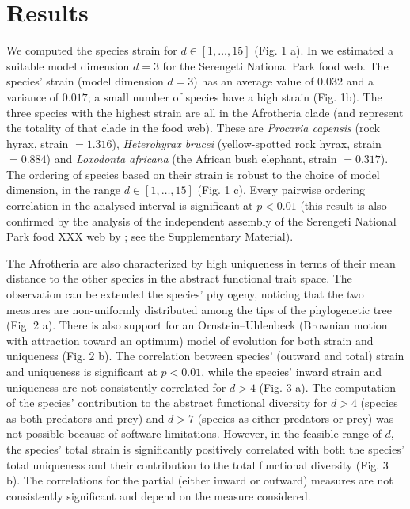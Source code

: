 \documentclass[12pt]{article}
\begin{document}

\section{Results}

We computed the species strain for $d \in \left[ 1, \dots,  15 \right]$ (Fig. 1
a). In \citep{dallariva2015exploring} we estimated a suitable model dimension $d = 3$
for the Serengeti National Park food web.  The species'
strain (model dimension $d = 3$) has an average value of $0.032$ and a variance of $0.017$;
a small number of species have a high strain (Fig. 1b). The
three species with the highest strain are all in the Afrotheria clade (and represent
the totality of that clade in the food web). These are \emph{Procavia
capensis} (rock hyrax, strain $= 1.316$), \emph{Heterohyrax
brucei} (yellow-spotted rock hyrax, strain $= 0.884$) and
\emph{Loxodonta africana} (the African bush elephant, strain
$= 0.317$). The ordering of species based on their strain is robust to the
choice of model dimension, in the range $d \in \left[ 1, \dots,  15 \right]$
(Fig. 1 c). Every pairwise ordering correlation in the analysed
interval is significant at $p < 0.01$ (this result is also confirmed
by the analysis of the independent assembly of the Serengeti National Park food
XXX web by \cite{de2011serengeti}; see the Supplementary Material).

The Afrotheria are also characterized by high uniqueness in terms of their
mean distance to the other species in the abstract functional trait space. The observation can
be extended the species' phylogeny, noticing that the two measures are non-uniformly
distributed among the tips of the phylogenetic tree (Fig. 2 a). There is also support
for an Ornstein--Uhlenbeck (Brownian motion with attraction toward
an optimum) model of evolution for both strain and uniqueness (Fig. 2 b). The
correlation between species' (outward and total) strain and uniqueness is
significant at $p < 0.01$, while the species' inward strain and
uniqueness are not consistently correlated for $d > 4$ (Fig. 3 a). 
The computation of the species' contribution to the abstract functional
diversity for $d > 4$ (species as both predators and
prey) and $d > 7$ (species as either predators or prey) was not possible because
of software limitations. However, in the feasible range of $d$, the species' total strain is
significantly positively correlated with both the species' total uniqueness
and their contribution to the total functional diversity (Fig. 3 b). The
correlations for the partial (either inward or outward) measures are not consistently
significant and depend on the measure considered.
\end{document}
